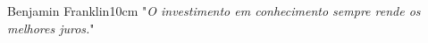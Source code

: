 \begin{epigrafe}{Benjamin Franklin}{10cm}
"\emph{O investimento em conhecimento sempre rende os melhores juros.}"
\end{epigrafe}
